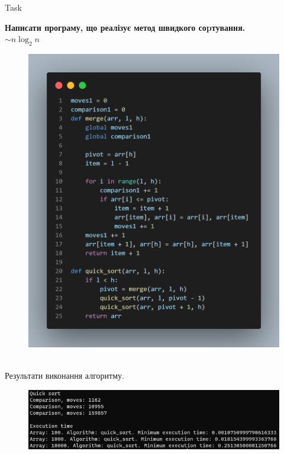 \documentclass[a4paper,12pt]{article}
\newcommand{\RomanNumeralCaps}[1]{\MakeUppercase{\romannumeral #1}}
\begin{document}
\newpage
    \begin{center}
        \Large{Task \RomanNumeralCaps{2}}
    \end{center}
    \textbf{Написати програму, що реалізує метод швидкого соpтування.} \\
    $\sim n\log_2n$ 
    \begin{figure}[h!]
        \begin{minipage}[h]{1\linewidth}
            \centering
            \includegraphics[width=0.8\linewidth]{Prt sc/Figure_3.png}  
        \end{minipage}
    \end{figure} \\
    Результати виконання алгоритму.
    \begin{figure}[h!]
        \begin{minipage}[h]{1\linewidth}
            \centering
            \includegraphics[width=1\linewidth]{Prt sc/Figure_4.png}
        \end{minipage}
    \end{figure}
\end{document}
